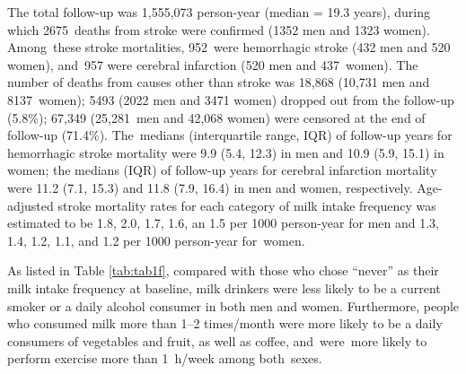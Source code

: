 \documentclass[nutrients,article,accept,moreauthors,pdftex]{Definitions/mdpi}
\begin{document}
The total follow-up was 1,555,073 person-year (median = 19.3 years),
during which 2675~deaths from stroke were confirmed (1352 men and 1323
women). Among~these stroke mortalities, 952~were hemorrhagic stroke (432
men and 520 women), and~957 were cerebral infarction (520 men and \mbox{437
women}). The number of deaths from causes other than stroke was 18,868 (10,731
men and 8137~women); 5493 (2022 men and 3471 women) dropped out from the
follow-up (5.8\%); 67,349 (25,281~men and 42,068 women) were censored at
the end of follow-up (71.4\%). The~medians (interquartile range, IQR) of
follow-up years for hemorrhagic stroke mortality were 9.9 (5.4, 12.3) in
men and 10.9 (5.9, 15.1) in women; the medians (IQR) of follow-up years
for cerebral infarction mortality were 11.2 (7.1, 15.3) and 11.8 (7.9,
16.4) in men and women, respectively. Age-adjusted stroke mortality
rates for each category of milk intake frequency was estimated to be
1.8, 2.0, 1.7, 1.6, an 1.5 per 1000 person-year for men and 1.3, 1.4, 1.2,
1.1, and 1.2 per 1000 person-year for~women.

As listed in {Table \ref{tab:tab1f}}, compared with those who
chose ``never'' as their milk intake frequency at baseline, milk
drinkers were less likely to be a current smoker or a daily alcohol
consumer in both men and women. Furthermore, people who consumed milk more
than 1--2 times/month were more likely to be a daily consumers of
vegetables and fruit, as well as coffee, and~were~more likely to perform exercise
more than 1~h/week among both~sexes.
\end{document}
